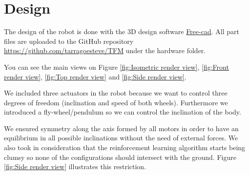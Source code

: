 \section{Design}
The design of the robot is done with the 3D design software \href{https://www.freecadweb.org/}{Free-cad}. All part files are uploaded to the GitHub repository \url{https://github.com/tarragoesteve/TFM} under the hardware folder.

You can see the main views on Figure \ref{fig:Isometric render view}, \ref{fig:Front render view}, \ref{fig:Top render view} and \ref{fig:Side render view}.

We included three actuators in the robot because we want to control three degrees of freedom (inclination and speed of both wheels). Furthermore we introduced a fly-wheel/pendulum so we can control the inclination of the body. 

We ensured symmetry along the axis formed by all motors in order to have an equilibrium in all possible inclinations without the need of external forces. We also took in consideration that the reinforcement learning algorithm starts being clumsy so none of the configurations should intersect with the ground. Figure \ref{fig:Side render view} illustrates this restriction.   

